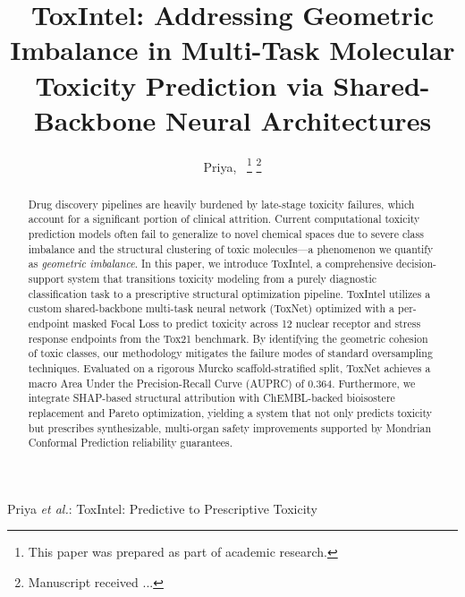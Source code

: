 \documentclass[lettersize,journal]{IEEEtran}
\begin{document}
\title{ToxIntel: Addressing Geometric Imbalance in Multi-Task Molecular Toxicity Prediction via Shared-Backbone Neural Architectures}

\author{Priya,~
\thanks{This paper was prepared as part of academic research.}%
\thanks{Manuscript received ...}}

%
{Priya \MakeLowercase{\textit{et al.}}: ToxIntel: Predictive to Prescriptive Toxicity}


\maketitle

\begin{abstract}
Drug discovery pipelines are heavily burdened by late-stage toxicity failures, which account for a significant portion of clinical attrition. Current computational toxicity prediction models often fail to generalize to novel chemical spaces due to severe class imbalance and the structural clustering of toxic molecules—a phenomenon we quantify as \textit{geometric imbalance}. In this paper, we introduce ToxIntel, a comprehensive decision-support system that transitions toxicity modeling from a purely diagnostic classification task to a prescriptive structural optimization pipeline. ToxIntel utilizes a custom shared-backbone multi-task neural network (ToxNet) optimized with a per-endpoint masked Focal Loss to predict toxicity across 12 nuclear receptor and stress response endpoints from the Tox21 benchmark. By identifying the geometric cohesion of toxic classes, our methodology mitigates the failure modes of standard oversampling techniques. Evaluated on a rigorous Murcko scaffold-stratified split, ToxNet achieves a macro Area Under the Precision-Recall Curve (AUPRC) of 0.364. Furthermore, we integrate SHAP-based structural attribution with ChEMBL-backed bioisostere replacement and Pareto optimization, yielding a system that not only predicts toxicity but prescribes synthesizable, multi-organ safety improvements supported by Mondrian Conformal Prediction reliability guarantees.
\end{abstract}
\end{document}
